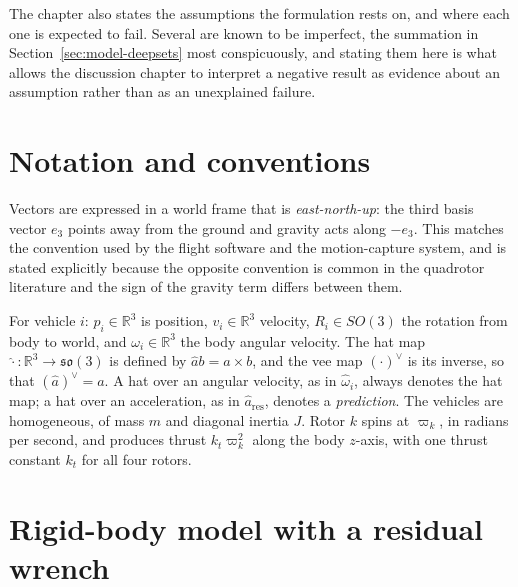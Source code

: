 The chapter also states the assumptions the formulation rests on, and where each one is expected
to fail. Several are known to be imperfect, the summation in
Section~\ref{sec:model-deepsets} most conspicuously, and stating them here is what allows
the discussion chapter to interpret a negative result as evidence about an assumption
rather than as an unexplained failure.

\section{Notation and conventions}
\label{sec:model-notation}

Vectors are expressed in a world frame that is \emph{east-north-up}: the third basis vector $e_3$
points away from the ground and gravity acts along $-e_3$. This matches the convention used by the
flight software and the motion-capture system, and is stated explicitly because the opposite
convention is common in the quadrotor literature and the sign of the gravity term differs between
them.

For vehicle $i$: $p_i \in \mathbb{R}^3$ is position, $v_i \in \mathbb{R}^3$ velocity,
$R_i \in SO(3)$ the rotation from body to world, and $\omega_i \in \mathbb{R}^3$ the body angular
velocity. The hat map $\hat{\cdot} : \mathbb{R}^3 \to \mathfrak{so}(3)$ is defined by
$\hat{a}b = a \times b$, and the vee map $(\cdot)^\vee$ is its inverse, so that
$(\hat a)^\vee = a$. A hat over an angular velocity, as in $\hat\omega_i$, always denotes the hat
map; a hat over an acceleration, as in $\hat a_{\mathrm{res}}$, denotes a \emph{prediction}. The
vehicles are homogeneous, of mass $m$ and diagonal inertia $J$. Rotor $k$ spins at $\varpi_k$, in
radians per second, and produces thrust $k_t\varpi_k^2$ along the body $z$-axis, with one thrust
constant $k_t$ for all four rotors.

\section{Rigid-body model with a residual wrench}
\label{sec:model-dynamics}

